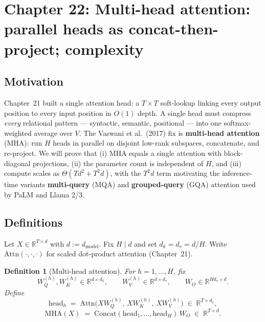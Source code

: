 \documentclass[11pt]{article}
\newtheorem{definition}[theorem]{Definition}
\theoremstyle{remark}
\begin{document}
\section*{Chapter 22: Multi-head attention: parallel heads as concat-then-project; complexity}

\subsection*{Motivation}

Chapter~21 built a single attention head: a $T \times T$ soft-lookup linking every output position to every input position in $O(1)$ depth. A single head must compress \emph{every} relational pattern --- syntactic, semantic, positional --- into one softmax-weighted average over $V$. The Vaswani et al.~(2017) fix is \textbf{multi-head attention} (MHA): run $H$ heads in parallel on disjoint low-rank subspaces, concatenate, and re-project. We will prove that (i) MHA equals a single attention with block-diagonal projections, (ii) the parameter count is independent of $H$, and (iii) compute scales as $\Theta(T d^2 + T^2 d)$, with the $T^2 d$ term motivating the inference-time variants \textbf{multi-query} (MQA) and \textbf{grouped-query} (GQA) attention used by PaLM and Llama 2/3.

\subsection*{Definitions}

Let $X \in \mathbb{R}^{T \times d}$ with $d := d_{\mathrm{model}}$. Fix $H \mid d$ and set $d_k = d_v = d/H$. Write $\mathrm{Attn}(\cdot,\cdot,\cdot)$ for scaled dot-product attention (Chapter~21).

\begin{definition}[Multi-head attention]
\label{def:mha}
For $h = 1, \dots, H$, fix
\[
W_Q^{(h)}, W_K^{(h)} \in \mathbb{R}^{d \times d_k}, \qquad W_V^{(h)} \in \mathbb{R}^{d \times d_v}, \qquad W_O \in \mathbb{R}^{H d_v \times d}.
\]
Define
\[
\mathrm{head}_h \;=\; \mathrm{Attn}\bigl(X W_Q^{(h)},\, X W_K^{(h)},\, X W_V^{(h)}\bigr) \;\in\; \mathbb{R}^{T \times d_v},
\]
\[
\boxed{\;\mathrm{MHA}(X) \;=\; \mathrm{Concat}(\mathrm{head}_1,\dots,\mathrm{head}_H)\, W_O \;\in\; \mathbb{R}^{T \times d}.\;}
\]
\end{definition}
\end{document}
